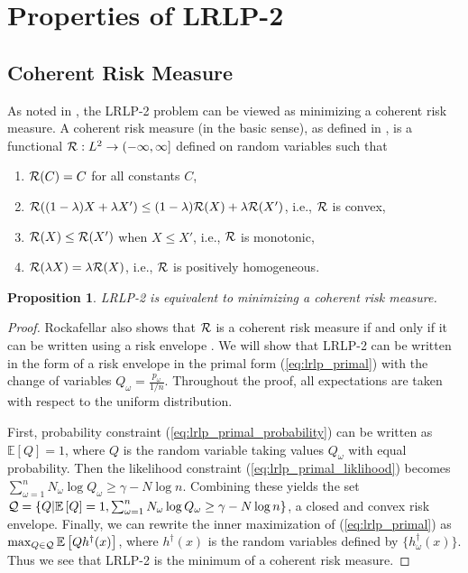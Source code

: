 \documentclass[11pt]{article}
\newcommand{\e}[1]{\mathbb{E} \left[ #1 \right]}
\newtheorem{proposition}[theorem]{Proposition}
\begin{document}
\section{Properties of LRLP-2}
\label{sec:properties}

\subsection{Coherent Risk Measure}
As noted in \cite{wang2010likelihood}, the LRLP-2 problem can be viewed as minimizing a coherent risk measure.
A coherent risk measure (in the basic sense), as defined in \cite{rockafellar2007coherent}, is a functional ${\cal R}: L^2 \rightarrow (-\infty,\infty]$ defined on random variables such that
\begin{enumerate}
	\item ${\cal R}(C) = C$ for all constants $C$,
	\item ${\cal R}((1-\lambda)X + \lambda X') \leq (1-\lambda){\cal R}(X) + \lambda {\cal R}(X')$, i.e., $\cal R$ is convex,
	\item ${\cal R}(X) \leq {\cal R}(X')$ when $X \leq X'$, i.e., $\cal R$ is monotonic,
	\item ${\cal R}(\lambda X) = \lambda {\cal R}(X)$, i.e., $\cal R$ is positively homogeneous.
\end{enumerate}

\begin{proposition}
	LRLP-2 is equivalent to minimizing a coherent risk measure.
\end{proposition}

\begin{proof}
	Rockafellar also shows that $\cal R$ is a coherent risk measure if and only if it can be written using a risk envelope \cite{rockafellar2007coherent}.
	We will show that LRLP-2 can be written in the form of a risk envelope in the primal form (\ref{eq:lrlp_primal}) with the change of variables $Q_\omega = \frac{p_\omega}{1/n}$.
	Throughout the proof, all expectations are taken with respect to the uniform distribution.
	
	First, probability constraint (\ref{eq:lrlp_primal_probability}) can be written as $\e{Q} = 1$, where $Q$ is the random variable taking values $Q_\omega$ with equal probability.
	Then the likelihood constraint (\ref{eq:lrlp_primal_liklihood}) becomes $\sum_{\omega=1}^n N_\omega \log Q_\omega \geq \gamma - N \log n$.
	Combining these yields the set ${\cal Q} = \{Q | \e{Q} = 1, \sum_{\omega=1}^n N_\omega \log Q_\omega \geq \gamma - N \log n \}$, a closed and convex risk envelope.
	Finally, we can rewrite the inner maximization of (\ref{eq:lrlp_primal}) as $\max_{Q \in {\cal Q}} \e{Qh^\dagger(x)}$, where $h^\dagger(x)$ is the random variables defined by $\{h^\dagger_\omega(x)\}$.
	Thus we see that LRLP-2 is the minimum of a coherent risk measure.
\end{proof}
\end{document}
